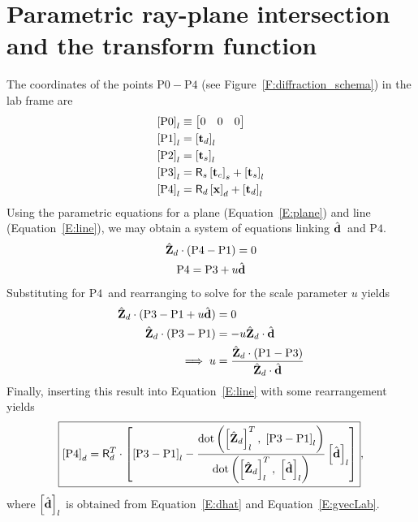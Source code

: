 \documentclass[12pt,letterpaper,final]{amsart}
\newcommand{\mbm}[1]{\ensuremath{\mbox{\boldmath$#1$}}}
\newcommand{\tvecd}{\ensuremath{\mbm{\mathrm{t}}_d}}
\newcommand{\tvecs}{\ensuremath{\mbm{\mathrm{t}}_s}}
\newcommand{\tvecc}{\ensuremath{\mbm{\mathrm{t}}_c}}
\newcommand{\rmatd}{\ensuremath{\mathsf{R}_d}}
\newcommand{\rmats}{\ensuremath{\mathsf{R}_s}}
\newcommand{\dhat}{\ensuremath{\hat{\mbm{\mathrm{d}}}}}
\newcommand{\detpt}{\ensuremath{\mbm{\mathrm{x}}}}
\newcommand{\ghati}{\ensuremath{\hat{G}_{i}}}
\newcommand{\dhati}{\ensuremath{\hat{d}_{i}}}
\newcommand{\ghatj}{\ensuremath{\hat{G}_{j}}}
\newcommand{\bhatj}{\ensuremath{\hat{b}_{j}}}
\newcommand{\Pzero}{\ensuremath{\mathrm{P0}}}
\newcommand{\Pone}{\ensuremath{\mathrm{P1}}}
\newcommand{\Ptwo}{\ensuremath{\mathrm{P2}}}
\newcommand{\Pthree}{\ensuremath{\mathrm{P3}}}
\newcommand{\Pfour}{\ensuremath{\mathrm{P4}}}
\newcommand{\Zl}{\ensuremath{\hat{\mbm{\mathrm{Z}}}_l}}
\newcommand{\Zd}{\ensuremath{\hat{\mbm{\mathrm{Z}}}_d}}
\newcommand{\labcomps}[1]{\left[#1\right]_l}
\newcommand{\detcomps}[1]{\left[#1\right]_d}
\newcommand{\sampcomps}[1]{\left[#1\right]_s}
\newcommand{\figref}[1]{Figure~\ref{#1}}
\newcommand{\eqnref}[1]{Equation~\ref{#1}}
\begin{document}
\section{Parametric ray-plane intersection and the transform function}\label{S:transform}
The coordinates of the points $\Pzero-\Pfour$ (see \figref{F:diffraction_schema}) in the lab frame are
\begin{align}
  \labcomps{\Pzero}  &\equiv \begin{bmatrix} 0 & 0 & 0 \end{bmatrix} \\
  \labcomps{\Pone}   &= \labcomps{\tvecd} \\
  \labcomps{\Ptwo}   &= \labcomps{\tvecs} \\
  \labcomps{\Pthree} &= \rmats\sampcomps{\tvecc} + \labcomps{\tvecs} \\
  \labcomps{\Pfour}  &= \rmatd\detcomps{\detpt} + \labcomps{\tvecd}
\end{align}
Using the parametric equations for a plane (\eqnref{E:plane}) and line (\eqnref{E:line}), we may obtain a system of equations linking \dhat\ and \Pfour.
\begin{gather}
\Zd \cdot (\Pfour - \Pone) = 0 \label{E:plane}\\
\Pfour = \Pthree + u\dhat \label{E:line}
\end{gather}
Substituting for \Pfour\ and rearranging to solve for the scale parameter $u$ yields
\begin{align}
    \Zd \cdot (\Pthree - \Pone + u\dhat) &= 0 \nonumber\\
    \Zd \cdot (\Pthree - \Pone) &= -u\Zd \cdot \dhat \nonumber\\
    \implies u &= \frac{\Zd \cdot (\Pone - \Pthree)}{\Zd \cdot \dhat
    }
\end{align}
Finally, inserting this result into \eqnref{E:line} with some rearrangement yields
\begin{equation}
  \boxed{\detcomps{\Pfour} = \rmatd^T \cdot \left[ \labcomps{\Pthree - \Pone} 
    - \frac{\mathrm{dot}\left(\labcomps{\Zd}^T,\; \labcomps{\Pthree - \Pone}\right)}
           {\mathrm{dot}\left(\labcomps{\Zd}^T,\; \labcomps{\dhat}\right)}\labcomps{\dhat} \right] }, \label{E:Pfour}
\end{equation}
where $\labcomps{\dhat}$ is obtained from \eqnref{E:dhat} and \eqnref{E:gvecLab}.
\end{document}
